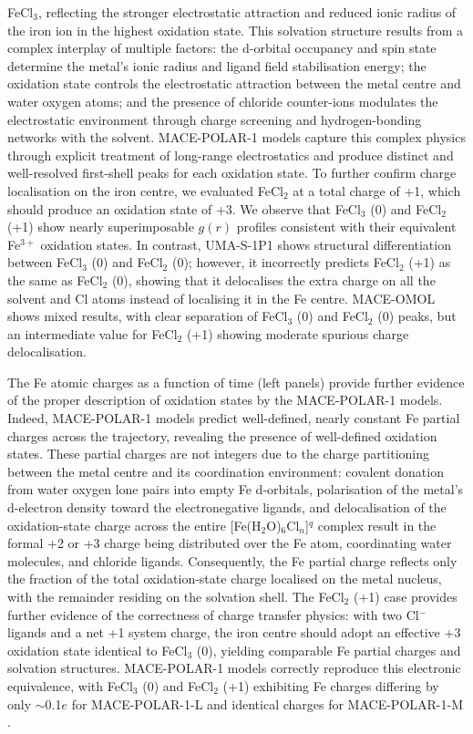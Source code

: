 \documentclass[aps,%
superscriptaddress,
 amsmath,amssymb,
floatfix,
twocolumn
]{revtex4-2}
\newcommand{\MOMOL}{MACE-OMOL }
\newcommand{\MFP}{MACE-POLAR-1 }
\newcommand{\MFPM}{MACE-POLAR-1-M }
\newcommand{\MFPL}{MACE-POLAR-1-L }
\newcommand{\UMAS}{UMA-S-1P1 }
\begin{document}
  FeCl$_3$, reflecting the stronger electrostatic attraction and reduced ionic radius of the iron ion in the highest oxidation state. This solvation structure results from a complex interplay of multiple factors: the
  d-orbital occupancy and spin state determine the metal's ionic radius and ligand field stabilisation energy; the oxidation state controls the electrostatic attraction between the metal centre and water oxygen atoms; and the presence of
  chloride counter-ions modulates the electrostatic environment through charge screening and hydrogen-bonding networks with the solvent. \MFP models capture this complex physics through explicit treatment of
  long-range electrostatics and produce distinct and well-resolved first-shell peaks for each oxidation state. To further confirm charge localisation on the iron centre, we evaluated FeCl$_2$ at a total charge of +1, which should produce an oxidation state of +3. We observe that FeCl$_3$ (0) and FeCl$_2$ (+1) show nearly superimposable $g(r)$ profiles consistent with their equivalent Fe$^{3+}$ oxidation states. In contrast, \UMAS shows structural differentiation between FeCl$_3$ (0) and FeCl$_2$ (0); however, it incorrectly predicts FeCl$_2$ (+1) as the same as FeCl$_2$ (0), showing that it delocalises the extra charge on all the solvent and Cl atoms instead of localising it in the Fe centre. \MOMOL shows mixed results, with clear separation of FeCl$_3$ (0) and FeCl$_2$ (0) peaks, but an intermediate value for FeCl$_2$ (+1) showing moderate spurious charge delocalisation.

  The Fe atomic charges as a function of time (left panels) provide further evidence of the proper description of oxidation states by the \MFP models. Indeed, \MFP models predict well-defined, nearly constant Fe partial charges across the trajectory, revealing the presence of well-defined oxidation states. These partial charges
  are not integers due to the charge partitioning between the metal centre and its coordination environment: covalent donation from water oxygen lone pairs into empty Fe d-orbitals,
  polarisation of the metal's d-electron density toward the electronegative ligands, and delocalisation of the oxidation-state charge across the entire [Fe(H$_2$O)$_6$Cl$_n$]$^{q}$ complex result in the formal +2 or +3 charge being
  distributed over the Fe atom, coordinating water molecules, and chloride ligands. Consequently, the Fe partial charge reflects only the fraction of the total oxidation-state charge localised on the metal nucleus, with the remainder
  residing on the solvation shell. The FeCl$_2$ (+1) case provides further evidence of the correctness of charge transfer physics: with two Cl$^-$ ligands and a net +1 system charge, the iron centre should adopt an effective +3 oxidation state
  identical to FeCl$_3$ (0), yielding comparable Fe partial charges and solvation structures. \MFP models correctly reproduce this electronic equivalence, with FeCl$_3$ (0) and FeCl$_2$ (+1) exhibiting Fe charges differing by only
  $\sim$0.1$e$ for \MFPL and identical charges for \MFPM. 
\end{document}
